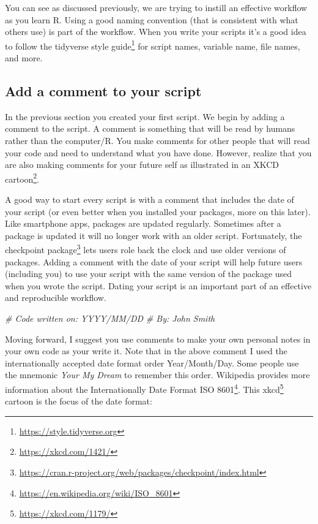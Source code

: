 \documentclass[
]{krantz}
\makeatletter
\newenvironment{Shaded}{\begin{snugshade}}{\end{snugshade}}
\newcommand{\CommentTok}[1]{\textcolor[rgb]{0.37,0.37,0.37}{\textit{#1}}}
\renewcommand{\href}[2]{#2\footnote{\url{#1}}}
\newenvironment{kframe}{%
\medskip{}
\setlength{\fboxsep}{.8em}
 \def\at@end@of@kframe{}%
 \ifinner\ifhmode%
  \def\at@end@of@kframe{\end{minipage}}%
  \begin{minipage}{\columnwidth}%
 \fi\fi%
 \def\FrameCommand##1{\hskip\@totalleftmargin \hskip-\fboxsep
 \colorbox{shadecolor}{##1}\hskip-\fboxsep
     \hskip-\linewidth \hskip-\@totalleftmargin \hskip\columnwidth}%
 \MakeFramed {\advance\hsize-\width
   \@totalleftmargin\z@ \linewidth\hsize
   \@setminipage}}%
 {\par\unskip\endMakeFramed%
 \at@end@of@kframe}
\renewenvironment{Shaded}{\begin{kframe}}{\end{kframe}}
\makeatother
\begin{document}
You can see as discussed previously, we are trying to instill an effective workflow as you learn R. Using a good naming convention (that is consistent with what others use) is part of the workflow. When you write your scripts it's a good idea to follow the \href{https://style.tidyverse.org}{tidyverse style guide} for script names, variable name, file names, and more.

\hypertarget{add-a-comment-to-your-script}{%
\subsection{Add a comment to your script}\label{add-a-comment-to-your-script}}

In the previous section you created your first script. We begin by adding a comment to the script. A comment is something that will be read by humans rather than the computer/R. You make comments for other people that will read your code and need to understand what you have done. However, realize that you are also making comments for your future self as illustrated in an \href{https://xkcd.com/1421/}{XKCD cartoon}.

A good way to start every script is with a comment that includes the date of your script (or even better when you installed your packages, more on this later). Like smartphone apps, packages are updated regularly. Sometimes after a package is updated it will no longer work with an older script. Fortunately, the \href{https://cran.r-project.org/web/packages/checkpoint/index.html}{checkpoint package} lets users role back the clock and use older versions of packages. Adding a comment with the date of your script will help future users (including you) to use your script with the same version of the package used when you wrote the script. Dating your script is an important part of an effective and reproducible workflow.

\begin{Shaded}
\begin{Highlighting}[]
\CommentTok{# Code written on: YYYY/MM/DD }
\CommentTok{# By: John Smith}
\end{Highlighting}
\end{Shaded}

Moving forward, I suggest you use comments to make your own personal notes in your own code as your write it. Note that in the above comment I used the internationally accepted date format order Year/Month/Day. Some people use the mnemonic \emph{Your My Dream} to remember this order. Wikipedia provides more information about the \href{https://en.wikipedia.org/wiki/ISO_8601}{Internationally Date Format ISO 8601}. This \href{https://xkcd.com/1179/}{xkcd} cartoon is the focus of the date format:
\end{document}
